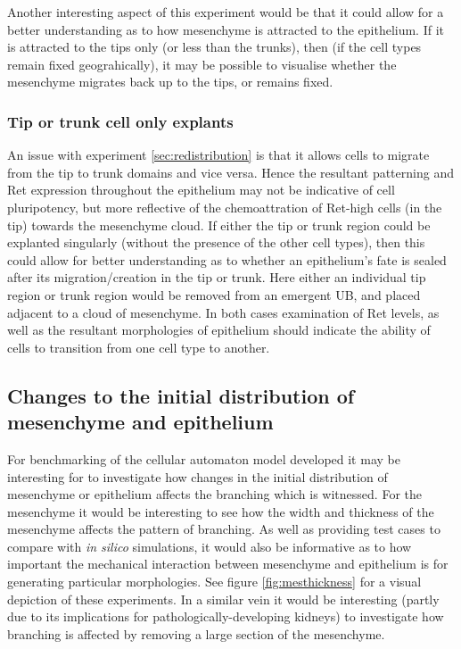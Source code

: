 \documentclass[pdftex,10pt,a4paper]{article}
\begin{document}
Another interesting aspect of this experiment would be that it could allow for a better understanding as to how mesenchyme is attracted to the epithelium. If it is attracted to the tips only (or less than the trunks), then (if the cell types remain fixed geograhically), it may be possible to visualise whether the mesenchyme migrates back up to the tips, or remains fixed.

\subsubsection{Tip or trunk cell only explants}
An issue with experiment \ref{sec:redistribution} is that it allows cells to migrate from the tip to trunk domains and vice versa. Hence the resultant patterning and Ret expression throughout the epithelium may not be indicative of cell pluripotency, but more reflective of the chemoattration of Ret-high cells (in the tip) towards the mesenchyme cloud. If either the tip or trunk region could be explanted singularly (without the presence of the other cell types), then this could allow for better understanding as to whether an epithelium's fate is sealed after its migration/creation in the tip or trunk. Here either an individual tip region or trunk region would be removed from an emergent UB, and placed adjacent to a cloud of mesenchyme. In both cases examination of Ret levels, as well as the resultant morphologies of epithelium should indicate the ability of cells to transition from one cell type to another.

\subsection{Changes to the initial distribution of mesenchyme and epithelium}
For benchmarking of the cellular automaton model developed it may be interesting for to investigate how changes in the initial distribution of mesenchyme or epithelium affects the branching which is witnessed. For the mesenchyme it would be interesting to see how the width and thickness of the mesenchyme affects the pattern of branching. As well as providing test cases to compare with \textit{in silico} simulations, it would also be informative as to how important the mechanical interaction between mesenchyme and epithelium is for generating particular morphologies. See figure \ref{fig:mesthickness} for a visual depiction of these experiments. In a similar vein it would be interesting (partly due to its implications for pathologically-developing kidneys) to investigate how branching is affected by removing a large section of the mesenchyme.
\end{document}
